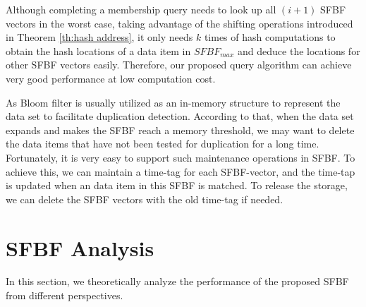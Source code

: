 \documentclass[10pt,journal,compsoc]{IEEEtran}
\begin{document}

Although completing a membership query needs to look up all $(i+1)$ SFBF vectors in the worst case, taking advantage of the shifting operations introduced in Theorem \ref{th:hash address}, it only needs $k$ times of hash computations to obtain the hash locations of a data item in $SFBF_{max}$ and deduce the locations for other SFBF vectors easily. Therefore, our proposed query algorithm can achieve very good performance at low computation cost.


As Bloom filter is usually utilized as an in-memory structure to represent the  data set to facilitate duplication detection. According to that,  when the data set expands and makes the SFBF reach a memory threshold, we may want to delete the data items that have not been tested for duplication for a long time. Fortunately, it is very easy to support such maintenance operations in SFBF. To achieve this, we can maintain a time-tag for each SFBF-vector, and the time-tap is updated when an data item in this SFBF is matched. To release the storage, we can delete the SFBF vectors with the old time-tag if needed.

%
\section{SFBF Analysis}
\label{sec:SFBF Analysis}

In this section, we theoretically analyze the performance of the proposed SFBF from different perspectives.
\end{document}

